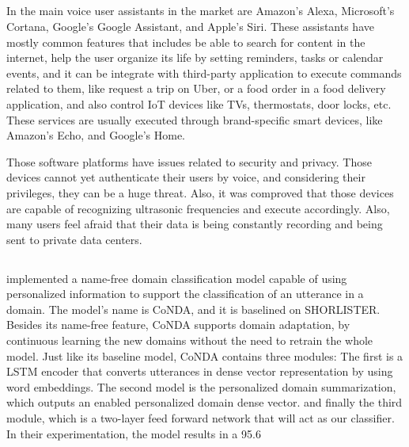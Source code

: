 \subsection{\RQII}

In \cite{Hoy201881} the main voice user assistants in the market are Amazon's Alexa, Microsoft's Cortana, Google's Google Assistant, and Apple's Siri. These assistants have mostly common features that includes be able to search for content in the internet, help the user organize its life by setting reminders, tasks or calendar events, and it can be integrate with third-party application to execute commands related to them, like request a trip on Uber, or a food order in a food delivery application, and also control IoT devices like TVs, thermostats, door locks, etc. These services are usually executed through brand-specific smart devices, like Amazon's Echo, and Google's Home.

Those software platforms have issues related to security and privacy. Those devices cannot yet authenticate their users by voice, and considering their privileges, they can be a huge threat. Also, it was comproved that those devices are capable of recognizing ultrasonic frequencies and execute accordingly. Also, many users feel afraid that their data is being constantly recording and being sent to private data centers.

\subsection{\RQIII}

\citet{Li20193784} implemented a name-free domain classification model capable of using personalized information to support the classification of an utterance in a domain. The model’s name is CoNDA, and it is baselined on SHORLISTER. Besides its name-free feature, CoNDA supports domain adaptation, by continuous learning the new domains without the need to retrain the whole model. Just like its baseline model, CoNDA contains three modules: The first is a LSTM encoder that converts utterances in dense vector representation by using word embeddings. The second model is the personalized domain summarization, which outputs an enabled personalized domain dense vector. and finally the third module, which is a two-layer feed forward network that will act as our classifier. In their experimentation, the model results in a 95.6%

